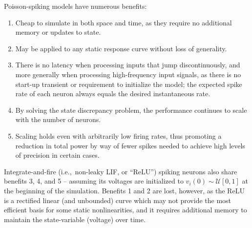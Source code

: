 Poisson-spiking models have numerous benefits:
\begin{enumerate}
\item Cheap to simulate in both space and time, as they require no additional memory or updates to state.
\item May be applied to any static response curve without loss of generality.
\item There is no latency when processing inputs that jump discontinuously, and more generally when processing high-frequency input signals, as there is no start-up transient or requirement to initialize the model; the expected spike rate of each neuron always equals the desired instantaneous rate.
\item By solving the state discrepancy problem, the performance continues to scale with the number of neurons.
\item Scaling holds even with arbitrarily low firing rates, thus promoting a reduction in total power by way of fewer spikes needed to achieve high levels of precision in certain cases.
\end{enumerate}
Integrate-and-fire (i.e.,~non-leaky LIF, or ``ReLU'') spiking neurons also share benefits 3, 4, and 5 -- assuming its voltages are initialized to $v_i(0) \sim \mathcal{U}[0, 1]$ at the beginning of the simulation.
Benefits 1 and 2 are lost, however, as the ReLU is a rectified linear (and unbounded) curve which may not provide the most efficient basis for some static nonlinearities, and it requires additional memory to maintain the state-variable (voltage) over time.

